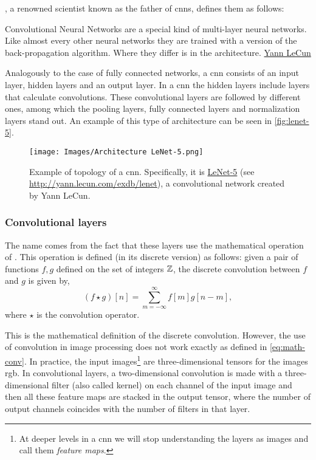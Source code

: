, a renowned scientist
known as the father of \glspl{cnn}, defines them as follows:
\begin{quoteBox}
  Convolutional Neural Networks are a special kind of multi-layer neural
  networks. Like almost every other neural networks they are trained with a
  version of the back-propagation algorithm. Where they differ is in the
  architecture.
  \tcblower\href{http://yann.lecun.com/index.html}{Yann LeCun}
\end{quoteBox}

Analogously to the case of fully connected networks, a \gls{cnn} consists of an
input layer, hidden layers and an output layer. In a \gls{cnn} the hidden
layers include layers that calculate convolutions. These convolutional layers
are followed by different ones, among which the pooling layers, fully connected
layers and normalization layers stand out. An example of this type of
architecture can be seen in \vref{fig:lenet-5}.

\begin{figure}[ht]
  \centering
  \texttt{[image: Images/Architecture LeNet-5.png]}
  \caption[Example of topology of a \acs*{cnn} (LeNet-5)]{Example of topology
    of a \gls{cnn}. Specifically, it is
    \href{http://yann.lecun.com/exdb/lenet}{LeNet-5} (see
    \url{http://yann.lecun.com/exdb/lenet}), a convolutional network created by
    Yann LeCun.}
  \label{fig:lenet-5}
\end{figure}

\subsubsection{Convolutional layers}
The name comes from the fact that these layers use the mathematical operation
of . This
operation is defined (in its discrete version) as follows: given a pair of
functions \(f, g\) defined on the set of integers \(\mathbb{Z}\), the discrete
convolution between \(f\) and \(g\) is given by,
\begin{equation} \label{eq:math-conv}
  (f \star g)[n] = \sum_{m=-\infty}^{\infty} f[m]g[n - m],
\end{equation}
where \(\star\) is the convolution operator.

This is the mathematical definition of the discrete convolution. However, the
use of convolution in image processing does not work exactly as defined in
\vref{eq:math-conv}. In practice, the input images\footnote{At deeper levels in
  a \gls{cnn} we will stop understanding the layers as images and call them
  \emph{feature maps}.} are three-dimensional tensors for the images
\acs{rgb}. In convolutional layers, a two-dimensional convolution is made with
a three-dimensional filter (also called kernel) on each channel of the input
image and then all these feature maps are stacked in the output tensor, where
the number of output channels coincides with the number of filters in that
layer.

